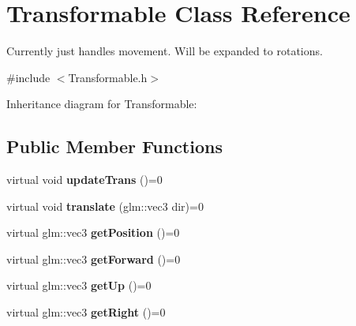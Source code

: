 \hypertarget{class_transformable}{\section{Transformable Class Reference}
\label{class_transformable}
}


Currently just handles movement. Will be expanded to rotations.  




{\ttfamily \#include $<$Transformable.\-h$>$}



Inheritance diagram for Transformable\-:
\subsection*{Public Member Functions}
\begin{DoxyCompactItemize}
\item 
\hypertarget{class_transformable_a8c6ccb0dbe1f6ebc9136e5f6703b054c}{virtual void {\bfseries update\-Trans} ()=0}\label{class_transformable_a8c6ccb0dbe1f6ebc9136e5f6703b054c}

\item 
\hypertarget{class_transformable_a8cbcc0d7da369b1c9b99a6a50abbbed1}{virtual void {\bfseries translate} (glm\-::vec3 dir)=0}\label{class_transformable_a8cbcc0d7da369b1c9b99a6a50abbbed1}

\item 
\hypertarget{class_transformable_a64982b71b3091ba82c24f709ba5dc3b2}{virtual glm\-::vec3 {\bfseries get\-Position} ()=0}\label{class_transformable_a64982b71b3091ba82c24f709ba5dc3b2}

\item 
\hypertarget{class_transformable_a12d8da28b3b27c3c6688f77da182451d}{virtual glm\-::vec3 {\bfseries get\-Forward} ()=0}\label{class_transformable_a12d8da28b3b27c3c6688f77da182451d}

\item 
\hypertarget{class_transformable_a1c2fb12f7b18483d17301c22efa836bb}{virtual glm\-::vec3 {\bfseries get\-Up} ()=0}\label{class_transformable_a1c2fb12f7b18483d17301c22efa836bb}

\item 
\hypertarget{class_transformable_a6e181023004dec38596c785e92c50e09}{virtual glm\-::vec3 {\bfseries get\-Right} ()=0}\label{class_transformable_a6e181023004dec38596c785e92c50e09}

\end{DoxyCompactItemize}
